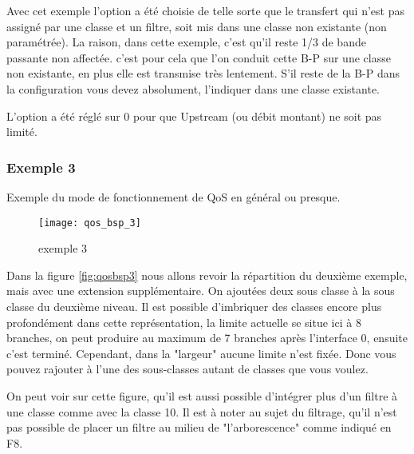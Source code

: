     Avec cet exemple l'option 
    a été choisie de telle sorte que le transfert qui n'est pas assigné
    par une classe et un filtre, soit mis dans une classe non existante
    (non paramétrée). La raison, dans cette exemple, c'est qu'il reste 1/3 de
    bande passante non affectée. c'est pour cela que l'on conduit cette B-P sur
    une classe non existante, en plus elle est transmise très lentement.
    S'il reste de la B-P dans la configuration vous devez absolument,
    l'indiquer dans une classe existante.

    L'option  a été réglé sur 0 pour
    que Upstream (ou débit montant) ne soit pas limité.



\subsubsection{Exemple 3}



    Exemple du mode de fonctionnement de QoS en général ou presque.

    \begin{figure}[htbp]
      \centering
      \texttt{[image: qos\_bsp\_3]}
      \caption{exemple 3}
    \end{figure}


    Dans la figure \ref{fig:qosbsp3} nous allons revoir la répartition
    du deuxième exemple, mais avec une extension supplémentaire. On ajoutées deux
    sous classe à la sous classe du deuxième niveau. Il est possible d'imbriquer
    des classes encore plus profondément dans cette représentation, la limite
    actuelle se situe ici à 8 branches, on peut produire au maximum de 7 branches
    après l'interface 0, ensuite c'est terminé. Cependant, dans la "largeur"
    aucune limite n'est fixée. Donc vous pouvez rajouter à l'une des sous-classes
    autant de classes que vous voulez.

    On peut voir sur cette figure, qu'il est aussi possible d'intégrer plus
    d'un filtre à une classe comme avec la classe 10. Il est à noter au sujet
    du filtrage, qu'il n'est pas possible de placer un filtre au milieu de
    "l'arborescence" comme indiqué en F8.

